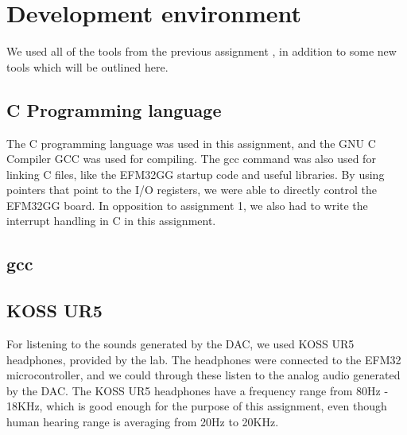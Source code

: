 \section{Development environment}
We used all of the tools from the previous assignment \cite{report-1}, in addition to some new tools which will be outlined here.

\subsection{C Programming language}
The C programming language was used in this assignment, and the GNU C Compiler GCC was used for compiling.
The gcc command was also used for linking C files, like the EFM32GG startup code and useful libraries. By using pointers that point to the I/O registers, we were able to directly control the EFM32GG board. In opposition to assignment 1, we also had to write the interrupt handling in C in this assignment.

\subsection{gcc}

\subsection{KOSS UR5}

For listening to the sounds generated by the DAC, we used KOSS UR5 headphones, provided by the lab.
The headphones were connected to the EFM32 microcontroller, and we could through these listen to the analog audio generated by the DAC.
The KOSS UR5 headphones have a frequency range from 80Hz - 18KHz, which is good enough for the purpose of this assignment, even though human hearing range is averaging from 20Hz to 20KHz.